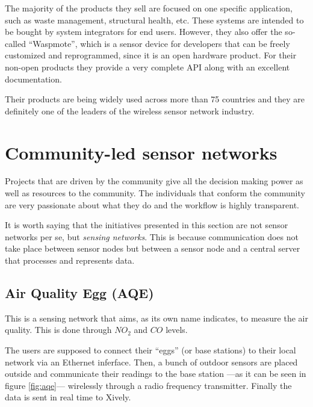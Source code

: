 The majority of the products they sell are focused on one specific application, such as waste management, structural health, etc. These systems are intended to be bought by system integrators for end users. However, they also offer the so-called ``Waspmote'', which is a sensor device for developers that can be freely customized and reprogrammed, since it is an open hardware product. For their non-open products they provide a very complete API along with an excellent documentation.

Their products are being widely used across more than 75 countries and they are definitely one of the leaders of the wireless sensor network industry.


\section{Community-led sensor networks}

Projects that are driven by the community give all the decision making power as well as resources to the community. The individuals that conform the community are very passionate about what they do and the workflow is highly transparent.

It is worth saying that the initiatives presented in this section are not sensor networks per se, but \emph{sensing networks}. This is because communication does not take place between sensor nodes but between a sensor node and a central server that processes and represents data.

\subsection{Air Quality Egg (AQE)}

This is a sensing network that aims, as its own name indicates, to measure the air quality. This is done through $NO_{2}$ and $CO$ levels.

The users are supposed to connect their ``eggs'' (or base stations) to their local network via an Ethernet inferface. Then, a bunch of outdoor sensors are placed outside and communicate their readings to the base station ---as it can be seen in figure \ref{fig:aqe}--- wirelessly through a radio frequency transmitter. Finally the data is sent in real time to Xively.

